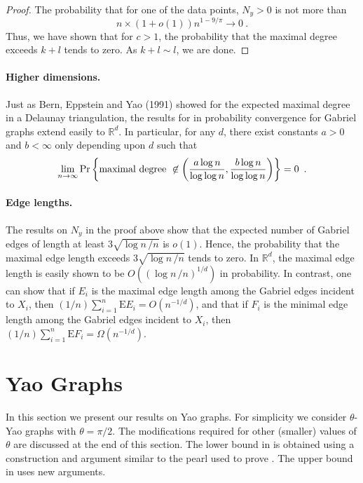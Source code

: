 \documentclass[lotsofwhite,charterfonts]{patmorin}
\newcommand{\RR}{\mathbb{R}}
\newcommand{\PROB}{\Pr}
\newcommand{\EXP}{\mathrm{E}}
\begin{document}
\begin{proof}
The probability that for one of the data points,
$N_y > 0$ is not more than
$$
n \times (1+o(1)) n^{1-9/\pi} \to 0~.
$$
Thus, we have shown that for $c > 1$, 
the probability that the maximal degree
exceeds $k+l$ tends to zero. As $k+l \sim l$, we are done.
\end{proof}


\paragraph{Higher dimensions.}
Just as Bern, Eppstein and Yao (1991) showed for the
expected maximal degree in a Delaunay triangulation, 
the results for in probability convergence for Gabriel graphs
extend easily to $\RR^d$. In particular,
for any $d$, there exist constants $a>0$ and $b < \infty$ 
only depending upon $d$ such that
$$
\lim_{n\to\infty} \PROB \left\{ \hbox{\rm maximal degree}~\not\in 
  \left( {a \log n \over \log \log n} , { b \log n \over \log \log n} \right)
  \right\} = 0 \enspace .
$$

\paragraph{Edge lengths.}
The results on $N_y$ in the proof above
show that the expected number of Gabriel
edges of length at least $3 \sqrt{\log n \,/n}$
is $o(1)$. Hence, the probability that the maximal edge
length exceeds $3 \sqrt{\log n \,/n}$ tends to zero.
In $\RR^d$, the maximal edge length is
easily shown to be $O((\log n \,/n)^{1/d})$ in
probability.
In contrast, one can show that if $E_i$ is the
maximal edge length among the Gabriel edges incident to $X_i$,
then $(1/n) \sum_{i=1}^n \EXP E_i = O(n^{-1/d})$,
and that if 
$F_i$ is the
minimal edge length among the Gabriel edges incident to $X_i$,
then $(1/n) \sum_{i=1}^n \EXP F_i = \Omega (n^{-1/d})$. 

\section{Yao Graphs}

In this section we present our results on Yao graphs.  For simplicity
we consider $\theta$-Yao graphs with $\theta=\pi/2$.  The modifications
required for other (smaller) values of $\theta$ are discussed at the end
of this section.  The lower bound in  is obtained
using a construction and argument similar to the pearl used to prove
.  The upper bound in 
uses new arguments.
\end{document}
